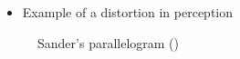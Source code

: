 \documentclass[
  ignorenonframetext,
]{beamer}
\providecommand{\tightlist}{%
  \setlength{\itemsep}{0pt}\setlength{\parskip}{0pt}}\usepackage{longtable,booktabs,array}
\begin{document}
\begin{frame}{}
\label{section-4}
\begin{itemize}
\tightlist
\item
  Example of a distortion in perception
\end{itemize}

\begin{figure}


\caption{\label{fig-sanders-parallelogram}Sander's parallelogram
()}

\end{figure}%
\end{frame}
\end{document}
